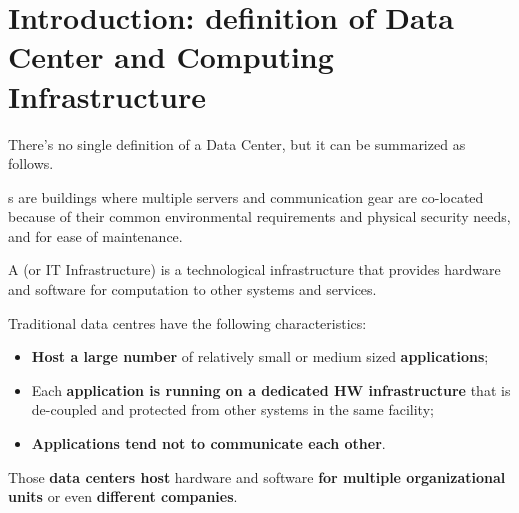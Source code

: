 \section{Introduction: definition of Data Center and Computing Infrastructure}

There's no single definition of a Data Center, but it can be summarized as follows.

\begin{definitionbox}\label{Data Center definition}
    s are buildings where multiple servers and communication gear are co-located because of their common environmental requirements and physical security needs, and for ease of maintenance.\cite{barroso2022datacenter}
\end{definitionbox}

\begin{definitionbox}
    A  (or IT Infrastructure) is a technological infrastructure that provides hardware and software for computation to other systems and services.
\end{definitionbox}

\noindent
Traditional data centres have the following characteristics:
\begin{itemize}
    \item \textbf{Host a large number} of relatively small or medium sized \textbf{applications};
    
    \item Each \textbf{application is running on a dedicated HW infrastructure} that is de-coupled and protected from other systems in the same facility;
    
    \item \textbf{Applications tend not to communicate each other}.
\end{itemize}
Those \textbf{data centers host} hardware and software \textbf{for multiple organizational units} or even \textbf{different companies}.